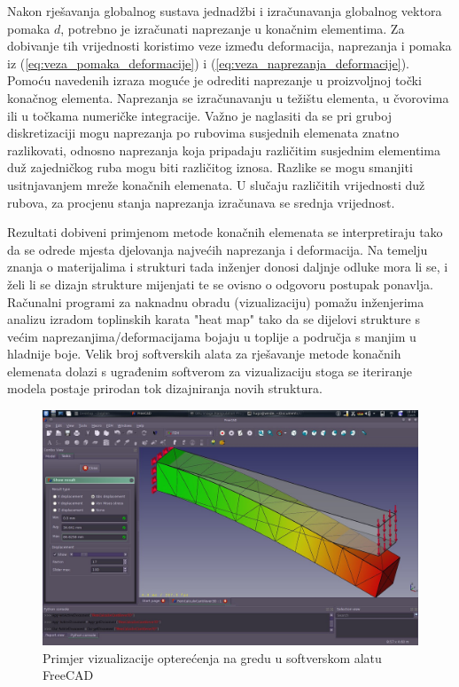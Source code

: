 \documentclass[a4paper,twoside,12pt]{memoir} %
\begin{document}
Nakon rješavanja globalnog sustava jednadžbi i izračunavanja globalnog vektora pomaka $d$, potrebno je izračunati naprezanje u konačnim elementima. Za dobivanje tih vrijednosti koristimo veze između deformacija, naprezanja i pomaka iz (\ref{eq:veza_pomaka_deformacije}) i (\ref{eq:veza_naprezanja_deformacije}). Pomoću navedenih izraza moguće je odrediti naprezanje u proizvoljnoj točki konačnog elementa. Naprezanja se izračunavanju u težištu elementa, u čvorovima ili u točkama numeričke integracije. Važno je naglasiti da se pri gruboj diskretizaciji mogu naprezanja po rubovima susjednih elemenata znatno razlikovati, odnosno naprezanja koja pripadaju različitim susjednim elementima duž zajedničkog ruba mogu biti različitog iznosa. Razlike se mogu smanjiti usitnjavanjem mreže konačnih elemenata. U slučaju različitih vrijednosti duž rubova, za procjenu stanja naprezanja izračunava se srednja vrijednost. \par

Rezultati dobiveni primjenom metode konačnih elemenata se interpretiraju tako da se odrede mjesta djelovanja najvećih naprezanja i deformacija. Na temelju znanja o materijalima i strukturi tada inženjer donosi daljnje odluke mora li se, i želi li se dizajn strukture mijenjati te se ovisno o odgovoru postupak ponavlja. Računalni programi za naknadnu obradu (vizualizaciju) pomažu inženjerima analizu izradom toplinskih karata "heat map" tako da se dijelovi strukture s većim naprezanjima/deformacijama bojaju u toplije a područja s manjim u hladnije boje. Velik broj softverskih alata za rješavanje metode konačnih elemenata dolazi s ugrađenim softverom za vizualizaciju stoga se iteriranje modela postaje prirodan tok dizajniranja novih struktura.

\begin{figure}[h!t]
\begin{center}
\includegraphics[scale=0.35]{pictures/chapter_fem/FEM_visualization_1.jpg}
\caption{Primjer vizualizacije opterećenja na gredu u softverskom alatu FreeCAD \cite{freefem_wiki_beam}}
\label{fig:freecad_beam}
\end{center}
\end{figure}
\end{document}
